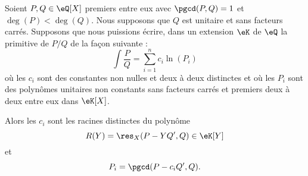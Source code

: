 \begin{theorem} \label{ThoXJFatfu}
    Soient \( P,Q\in \eQ[X]\) premiers entre eux avec \( \pgcd(P,Q)=1\) et \( \deg(P)<\deg(Q)\). Nous supposons que \( Q\) est unitaire et sans facteurs carrés. Supposons que nous puissions écrire, dans un extension \( \eK\) de \( \eQ\) la primitive de \( P/Q\) de la façon suivante :
    \begin{equation}        \label{EqCHVaDay}
        \int\frac{ P }{ Q }=\sum_{i=1}^n c_i\ln(P_i)
    \end{equation}
    où les \( c_i\) sont des constantes non nulles et deux à deux distinctes et où les \( P_i\) sont des polynômes unitaires non constants sans facteurs carrés et premiers deux à deux entre eux dans \( \eK[X]\).

    Alors les \( c_i\) sont les racines distinctes du polynôme
    \begin{equation}
        R(Y)=\res_X(P-YQ',Q)\in \eK[Y]
    \end{equation}
    et
    \begin{equation}
        P_i=\pgcd(P-c_iQ',Q).
    \end{equation}
\end{theorem}


